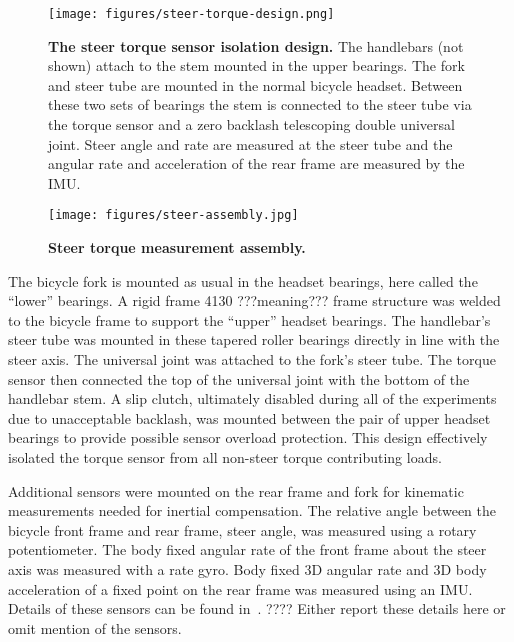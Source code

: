 \documentclass[10pt]{article}
\begin{document}
\begin{figure}
  \centering
  \texttt{[image: figures/steer-torque-design.png]}
  \caption{{\bf The steer torque sensor isolation design.} The handlebars (not shown) attach to
    the stem mounted in the upper bearings. The fork and steer tube
    are mounted in the normal bicycle headset. Between these two sets of
    bearings the stem is connected to the steer tube via the torque sensor and a
    zero backlash telescoping double universal joint. Steer angle and rate
    are measured at the steer tube and the angular rate and acceleration of the rear frame
    are measured by the IMU.}
  \label{fig:steer-torque-design}
\end{figure}

\begin{figure}
  \centering
  \texttt{[image: figures/steer-assembly.jpg]}
  \caption{{\bf Steer torque measurement assembly.} }
  \label{fig:steer-torque-design}
\end{figure}

The bicycle fork is mounted as usual in the headset bearings, here
called the ``lower''  bearings. A rigid frame 4130 ???meaning???  frame structure was
welded to the bicycle frame to support the ``upper'' headset bearings. The
handlebar's steer tube was mounted in these tapered roller bearings directly
in line with the steer axis. The universal joint was attached to the fork's
steer tube. The torque sensor then connected the top of the universal joint
with the bottom of the handlebar stem. A slip clutch, ultimately
disabled during all of the experiments due to unacceptable backlash, was mounted between the
pair of upper headset bearings to provide possible sensor overload protection. This
design effectively isolated the torque sensor from all non-steer torque contributing
loads.

Additional sensors were mounted on the rear frame and fork for kinematic
measurements needed for inertial compensation. The relative angle between
the bicycle front frame and rear frame, steer angle, was measured using a
rotary potentiometer. The body fixed angular rate of the front frame about the steer
axis was measured with a rate gyro. Body fixed 3D angular rate and 3D
body acceleration of a fixed point  on the rear frame was measured using an IMU.
Details of these sensors can be found in~\cite{Moore2012}. ???? Either report these details here or omit mention of the sensors.

\end{document}
